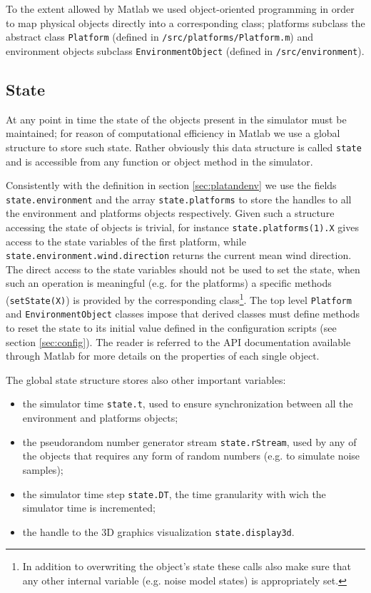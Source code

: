 \documentclass[a4paper,11pt]{report}
\begin{document}
To the extent allowed by Matlab we used object-oriented programming in order to map physical objects directly into a corresponding class; platforms subclass the abstract class \texttt{Platform} (defined in \texttt{/src/platforms/Platform.m}) and environment objects subclass \texttt{EnvironmentObject} (defined in \texttt{/src/environment}).

\subsection{State}\label{sec:state}

At any point in time the state of the objects present in the simulator must be maintained; for reason of computational efficiency in Matlab we use a global structure to store such state. Rather obviously this data structure is called \texttt{state} and is accessible from any function or object method in the simulator.

Consistently with the definition in section \ref{sec:platandenv} we use the fields \texttt{state.environment} and the array \texttt{state.platforms} to store the handles to all the environment and platforms objects respectively. 
Given such a structure accessing the state of objects is trivial, for instance \texttt{state.platforms(1).X} gives access to the state variables of the first platform, while \texttt{state.environment.wind.direction} returns the current mean wind direction. 
The direct access to the state variables should not be used to set the state, when such an operation is meaningful (e.g. for the platforms) a specific methods (\texttt{setState(X)}) is provided by the corresponding class\footnote{In addition to overwriting the object's state these calls also make sure that 
any other internal variable (e.g. noise model states) is appropriately set.}.
The top level \texttt{Platform} and \texttt{EnvironmentObject} classes impose that derived classes must define methods to reset the state to its initial value defined in the configuration scripts (see section \ref{sec:config}).
The reader is referred to the API documentation available through Matlab for more details on the properties of each single object.

The global state structure stores also other important variables:
\begin{itemize}
 \item the simulator time \texttt{state.t}, used to ensure synchronization between all the environment and platforms objects;
 \item the pseudorandom number generator stream \texttt{state.rStream}, used by any of the objects that requires any form of random numbers (e.g. to simulate noise samples);
 \item the simulator time step \texttt{state.DT}, the time granularity with wich the simulator time is incremented;
 \item the handle to the 3D graphics visualization \texttt{state.display3d}.
\end{itemize}
\end{document}
